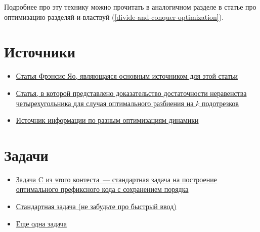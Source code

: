 Подробнее про эту технику можно прочитать в аналогичном разделе в статье про оптимизацию разделяй-и-властвуй (\ref{divide-and-conquer-optimization}).

\section{Источники}

\begin{itemize}
    \item \href{https://cse.hkust.edu.hk/mjg_lib/bibs/DPSu/DPSu.Files/p429-yao.pdf}{Статья Фрэнсис Яо, являющаяся основным источником для этой статьи}

    \item \href{https://cse.hkust.edu.hk/mjg_lib/bibs/DPSu/DPSu.Files/sdarticle_204.pdf}{Статья, в которой представлено доказательство достаточности неравенства четырехугольника для случая оптимального разбиения на $k$ подотрезков}

    \item \href{https://codeforces.com/blog/entry/8219}{Источник информации по разным оптимизациям динамики}
\end{itemize}

\section{Задачи}

\begin{itemize}
    \item \href{https://codeforces.com/group/j9VlExDLmA/contest/100212}{Задача C из этого контеста~--- стандартная задача на построение оптимального префиксного кода с сохранением порядка}
    \item \href{https://codeforces.com/contest/321/problem/E}{Стандартная задача (не забудьте про быстрый ввод)}
    \item \href{https://www.hackerrank.com/contests/ioi-2014-practice-contest-2/challenges/guardians-lunatics-ioi14}{Еще одна задача}
\end{itemize}

